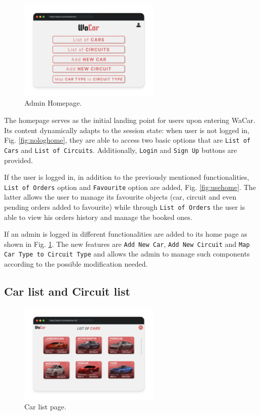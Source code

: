 \begin{figure}[h]
    \centering
    \includegraphics[width=0.6\textwidth]{mockup/AdminHome.png}
    \caption{Admin Homepage.}
    \label{fig:adminhome}
\end{figure}

The homepage serves as the initial landing point for users upon entering WaCar. Its content dynamically adapts to the session state: when user is not logged in, Fig. \ref{fig:nologhome}, they are able to access two basic options that are \texttt{List of Cars} and \texttt{List of Circuits}. Additionally, \texttt{Login} and \texttt{Sign Up} buttons are provided.

If the user is logged in, in addition to the previously mentioned functionalities, \texttt{List of Orders} option and \texttt{Favourite} option are added, Fig. \ref{fig:usehome}. The latter allows the user to manage its favourite objects (car, circuit and even pending orders added to favourite) while through \texttt{List of Orders} the user is able to view his orders history and manage the booked ones.

If an admin is logged in different functionalities are added to its home page as shown in Fig. \ref{fig:adminhome}. The new features are \texttt{Add New Car}, \texttt{Add New Circuit} and \texttt{Map Car Type to Circuit Type} and allows the admin to manage such components according to the possible modification needed.

\subsection{Car list and Circuit list}

\begin{figure}[h]
  \centering
    \includegraphics[width=0.6\textwidth]{mockup/CarList.png}
    \caption{Car list page.}
    \label{fig:carlist}
\end{figure}

